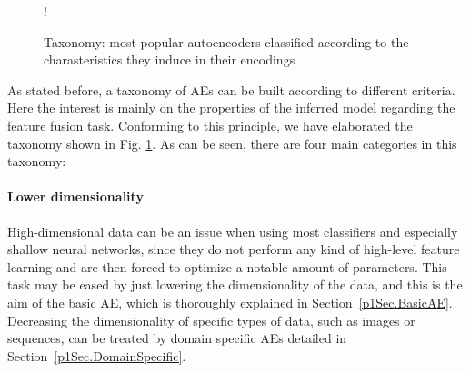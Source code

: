 \begin{figure}[htp!]
	\centering
	 {!} {
		
	}
	\caption{Taxonomy: most popular autoencoders classified according to the charasteristics they induce in their encodings}
	\label{p1fig:autoencoder-taxonomy}
\end{figure}

As stated before, a taxonomy of AEs can be built according to different criteria. Here the interest is mainly on the properties of the inferred model regarding the feature fusion task. Conforming to this principle, we have elaborated the taxonomy shown in Fig. \ref{p1fig:autoencoder-taxonomy}. As can be seen, there are four main categories in this taxonomy:

\paragraph{Lower dimensionality}
High-dimensional data can be an issue when using most classifiers and especially shallow neural networks, since they do not perform any kind of high-level feature learning and are then forced to optimize a notable amount of parameters. This task may be eased by just lowering the dimensionality of the data, and this is the aim of the basic AE, which is thoroughly explained in Section~\ref{p1Sec.BasicAE}. Decreasing the dimensionality of specific types of data, such as images or sequences, can be treated by domain specific AEs detailed in Section~\ref{p1Sec.DomainSpecific}.

